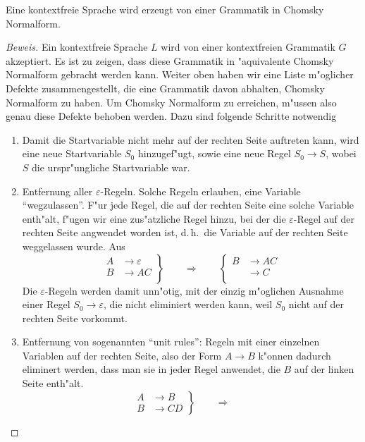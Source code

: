 \begin{satz}
Eine kontextfreie Sprache wird erzeugt von einer Grammatik
in Chomsky Normalform.
\end{satz}

\begin{proof}[Beweis]
Ein kontextfreie Sprache $L$ wird von einer kontextfreien Grammatik
$G$ akzeptiert. Es ist zu zeigen, dass diese Grammatik in
"aquivalente Chomsky Normalform gebracht werden kann.
Weiter oben haben wir eine Liste
m"oglicher Defekte zusammengestellt, die eine Grammatik davon abhalten,
Chomsky Normalform zu haben. Um Chomsky Normalform zu erreichen,
m"ussen also genau diese Defekte behoben werden.
Dazu sind folgende Schritte notwendig
\begin{enumerate}
\item Damit die Startvariable nicht mehr auf der rechten Seite auftreten
kann, wird eine neue Startvariable $S_0$ hinzugef"ugt, sowie eine
neue Regel
$S_0\to S$, wobei $S$ die urspr"ungliche Startvariable war.
\item Entfernung aller $\varepsilon$-Regeln. Solche Regeln erlauben,
eine Variable ``wegzulassen''. F"ur jede Regel, die auf der rechten
Seite eine solche Variable enth"alt, f"ugen wir eine zus"atzliche
Regel hinzu, bei der die $\varepsilon$-Regel auf der rechten Seite
angwendet worden ist, d.\,h.~die Variable auf der rechten Seite weggelassen
wurde.  Aus
\[
\left.
\begin{aligned}
A&\to\varepsilon\\
B&\to AC\\
\end{aligned}
\right\}
\qquad
\Rightarrow
\qquad
\left\{
\begin{aligned}
B&\to AC\\
&\to C\\
\end{aligned}
\right.
\]
Die $\varepsilon$-Regeln werden damit unn"otig, mit der einzig
m"oglichen Ausnahme einer Regel $S_0\to\varepsilon$, die nicht
eliminiert werden kann, weil $S_0$ nicht auf der rechten Seite
vorkommt.
\item Entfernung von sogenannten ``unit rules'': Regeln mit einer einzelnen Variablen auf der rechten Seite, also 
der Form $A\to B$ k"onnen dadurch eliminert werden, dass man
sie in jeder Regel anwendet, die $B$ auf der linken Seite enth"alt.
\[
\left.
\begin{aligned}
A&\to B\\
B&\to CD
\end{aligned}
\right\}
\qquad\Rightarrow\qquad
\]
\end{enumerate}
\end{proof}

